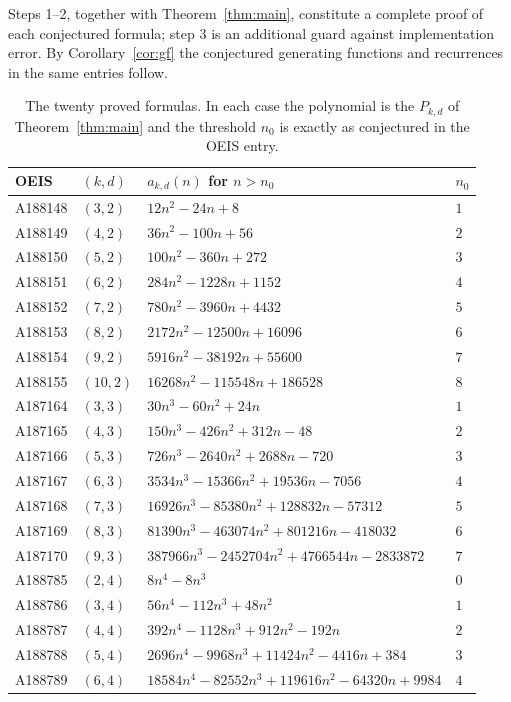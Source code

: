 \documentclass[11pt]{article}
\begin{document}
Steps 1--2, together with Theorem~\ref{thm:main}, constitute a complete
proof of each conjectured formula; step 3 is an additional guard against
implementation error.  By Corollary~\ref{cor:gf} the conjectured
generating functions and recurrences in the same entries follow.

\begin{table}[ht]
\centering
\small
\begin{tabular}{@{}llll@{}}
\toprule
OEIS & $(k,d)$ & $a_{k,d}(n)$ for $n > n_0$ & $n_0$ \\
\midrule
A188148 & $(3,2)$  & $12n^2-24n+8$ & $1$ \\
A188149 & $(4,2)$  & $36n^2-100n+56$ & $2$ \\
A188150 & $(5,2)$  & $100n^2-360n+272$ & $3$ \\
A188151 & $(6,2)$  & $284n^2-1228n+1152$ & $4$ \\
A188152 & $(7,2)$  & $780n^2-3960n+4432$ & $5$ \\
A188153 & $(8,2)$  & $2172n^2-12500n+16096$ & $6$ \\
A188154 & $(9,2)$  & $5916n^2-38192n+55600$ & $7$ \\
A188155 & $(10,2)$ & $16268n^2-115548n+186528$ & $8$ \\
\midrule
A187164 & $(3,3)$  & $30n^3-60n^2+24n$ & $1$ \\
A187165 & $(4,3)$  & $150n^3-426n^2+312n-48$ & $2$ \\
A187166 & $(5,3)$  & $726n^3-2640n^2+2688n-720$ & $3$ \\
A187167 & $(6,3)$  & $3534n^3-15366n^2+19536n-7056$ & $4$ \\
A187168 & $(7,3)$  & $16926n^3-85380n^2+128832n-57312$ & $5$ \\
A187169 & $(8,3)$  & $81390n^3-463074n^2+801216n-418032$ & $6$ \\
A187170 & $(9,3)$  & $387966n^3-2452704n^2+4766544n-2833872$ & $7$ \\
\midrule
A188785 & $(2,4)$  & $8n^4-8n^3$ & $0$ \\
A188786 & $(3,4)$  & $56n^4-112n^3+48n^2$ & $1$ \\
A188787 & $(4,4)$  & $392n^4-1128n^3+912n^2-192n$ & $2$ \\
A188788 & $(5,4)$  & $2696n^4-9968n^3+11424n^2-4416n+384$ & $3$ \\
A188789 & $(6,4)$  & $18584n^4-82552n^3+119616n^2-64320n+9984$ & $4$ \\
\bottomrule
\end{tabular}
\caption{The twenty proved formulas.  In each case the polynomial is the
$P_{k,d}$ of Theorem~\ref{thm:main} and the threshold $n_0$ is exactly as
conjectured in the OEIS entry.}
\label{tab:results}
\end{table}
\end{document}
